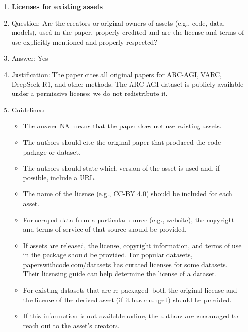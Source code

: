\documentclass{article}
\newcommand{\answerYes}[1][]{Yes}
\begin{document}
\begin{enumerate}
\item {\bf Licenses for existing assets}
    \item[] Question: Are the creators or original owners of assets (e.g., code, data, models), used in the paper, properly credited and are the license and terms of use explicitly mentioned and properly respected?
    \item[] Answer: \answerYes{}
    \item[] Justification: The paper cites all original papers for ARC-AGI, VARC, DeepSeek-R1, and other methods. The ARC-AGI dataset is publicly available under a permissive license; we do not redistribute it.
    \item[] Guidelines:
    \begin{itemize}
        \item The answer NA means that the paper does not use existing assets.
        \item The authors should cite the original paper that produced the code package or dataset.
        \item The authors should state which version of the asset is used and, if possible, include a URL.
        \item The name of the license (e.g., CC-BY 4.0) should be included for each asset.
        \item For scraped data from a particular source (e.g., website), the copyright and terms of service of that source should be provided.
        \item If assets are released, the license, copyright information, and terms of use in the package should be provided. For popular datasets, \url{paperswithcode.com/datasets} has curated licenses for some datasets. Their licensing guide can help determine the license of a dataset.
        \item For existing datasets that are re-packaged, both the original license and the license of the derived asset (if it has changed) should be provided.
        \item If this information is not available online, the authors are encouraged to reach out to the asset's creators.
    \end{itemize}


\end{enumerate}
\end{document}

